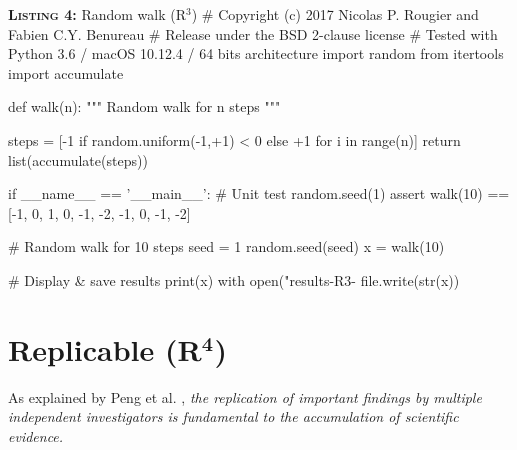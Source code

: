 \documentclass[a4paper,11pt]{article}
\begin{document}


\begin{code}{\textbf{\textsc{Listing 4:}} Random walk (R$^3$)}
# Copyright (c) 2017 Nicolas P. Rougier and Fabien C.Y. Benureau
# Release under the BSD 2-clause license
# Tested with Python 3.6 / macOS 10.12.4 / 64 bits architecture
import random
from itertools import accumulate

def walk(n):
    """ Random walk for n steps """

    steps = [-1 if random.uniform(-1,+1) < 0 else +1 for i in range(n)]
    return list(accumulate(steps))

if __name__ == '__main__':
    # Unit test
    random.seed(1)
    assert walk(10) == [-1, 0, 1, 0, -1, -2, -1, 0, -1, -2]

    # Random walk for 10 steps
    seed = 1
    random.seed(seed)
    x = walk(10)
    
    # Display & save results
    print(x)
    with open("results-R3-%
        file.write(str(x))
\end{code}


\clearpage
\section*{Replicable (R$^{\mathbf 4}$)}

As explained by Peng et al. \cite{Peng:2006}, {\em the replication of important findings by multiple independent investigators is fundamental to the accumulation of scientific evidence.}\\
\end{document}
